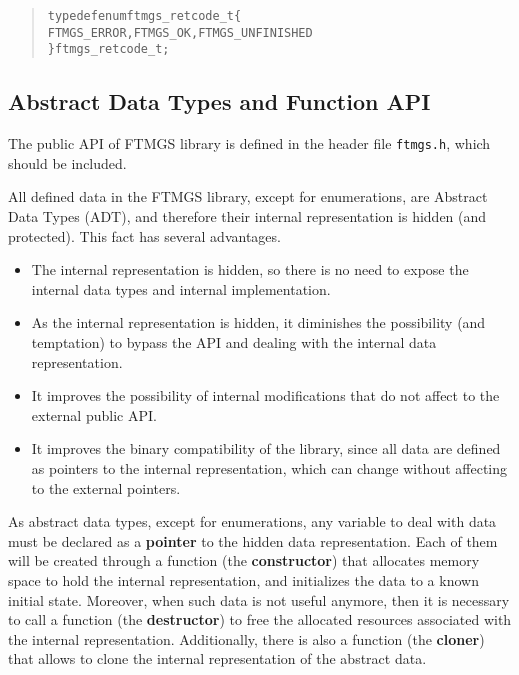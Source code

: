 \documentclass[a4paper]{article}
\newenvironment{code}%
{\begin{quote}\footnotesize\begin{alltt}}%
{\end{alltt}\end{quote}}%
\begin{document}
\begin{code}
typedef enum ftmgs_retcode_t \{
    FTMGS_ERROR, FTMGS_OK, FTMGS_UNFINISHED
\} ftmgs_retcode_t;
\end{code}

\subsection{Abstract Data Types and Function API}

The public API of FTMGS library is defined in the header file
\verb|ftmgs.h|, which should be included.

All defined data in the FTMGS library, except for enumerations, are
Abstract Data Types (ADT), and therefore their internal representation
is hidden (and protected). This fact has several advantages. 

{\footnotesize\begin{itemize}%
\item The internal representation is hidden, so there is no need to
  expose the internal data types and internal implementation.
\item As the internal representation is hidden, it diminishes the
  possibility (and temptation) to bypass the API and dealing with the
  internal data representation.
\item It improves the possibility of internal modifications that do
  not affect to the external public API.
\item It improves the binary compatibility of the library, since all
  data are defined as pointers to the internal representation, which
  can change without affecting to the external pointers.
\end{itemize}}%

As abstract data types, except for enumerations, any variable to deal
with data must be declared as a \textbf{pointer} to the hidden data
representation. Each of them will be created through a function (the
\textbf{constructor}) that allocates memory space to hold the internal
representation, and initializes the data to a known initial
state. Moreover, when such data is not useful anymore, then it is
necessary to call a function (the \textbf{destructor}) to free the
allocated resources associated with the internal
representation. Additionally, there is also a function (the
\textbf{cloner}) that allows to clone the internal representation of
the abstract data.
\end{document}
